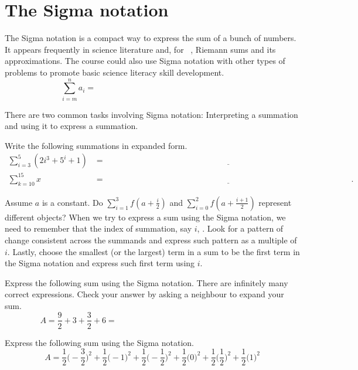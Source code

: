 \documentclass[../main.tex]{subfiles}
\begin{document}
 \section{The Sigma notation}
  The Sigma notation is a compact way to express the sum of a bunch of numbers. It appears frequently in science literature and, for \thecoursesubject~\thecoursenumb, Riemann sums and its approximations. The course could also use Sigma notation with other types of problems to promote basic science literacy skill development.
  {\huge \[ \sum_{i=m}^{n} a_{i} = \hspace{3in}\]}

  There are two common tasks involving Sigma notation: Interpreting a summation and using it to express a summation.
  \begin{example} \label{ex:sigma-notation-read)}
    Write the following summations in expanded form.
    \begin{align*}
      \sum_{i=3}^{5} (2i^{3} + 5^{i} + 1)
      &= \underline{\hspace{5in}} \\[3ex]
      \sum_{k=10}^{15} x
      &= \underline{\hspace{5in}}.
    \end{align*}
  \end{example}
  \faComment{} Assume \(a\) is a constant. Do \(\sum_{i=1}^{3}f\left(a + \frac{i}{2}\right)\) and \(\sum_{i=0}^{2}f\left(a + \frac{i+1}{2}\right)\) represent different objects? 
  \clearpage
  When we try to express a sum using the Sigma notation, we need to remember that the index of summation, say \(i\), . Look for a pattern of change consistent across the summands and express such pattern as a multiple of \(i\).  Lastly, choose the smallest (or the largest) term in a sum to be the first term in the Sigma notation and express such first term using \(i\).

  \begin{example}
    Express the following sum using the Sigma notation. There are infinitely many correct expressions. Check your answer by asking a neighbour to expand your sum.
    \[
      A = \frac{9}{2} + 3 + \frac{3}{2} + 6 = \hspace{3in}
    \]
  \end{example}

  \begin{example}
    Express the following sum using the Sigma notation. 
    \[
      A = \frac{1}{2} \bigg( -\frac{3}{2} \bigg)^{2} + \frac{1}{2} \bigg( -1 \bigg)^{2} + \frac{1}{2} \bigg( -\frac{1}{2} \bigg)^{2} + \frac{1}{2} \bigg( 0 \bigg)^{2} + \frac{1}{2} \bigg( \frac{1}{2} \bigg)^{2} + \frac{1}{2} \bigg( 1 \bigg)^{2}
    \]
  \end{example}
  \vfill
\end{document}
